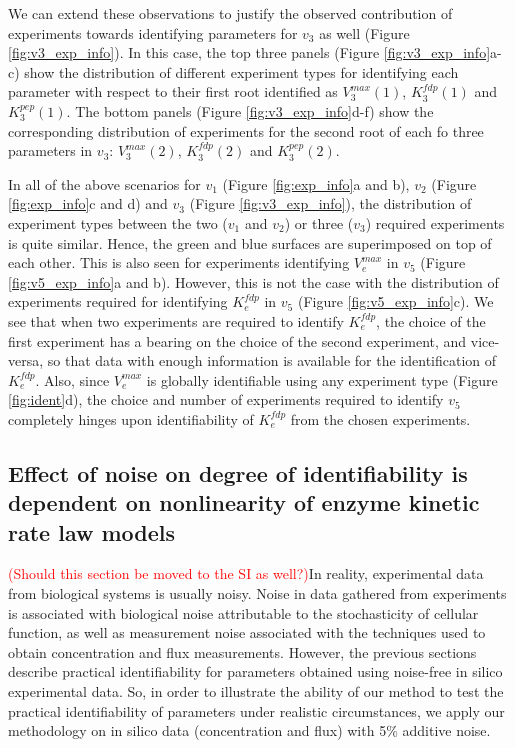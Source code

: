 \documentclass[10pt]{article}
\begin{document}
	We can extend these observations to justify the observed contribution of experiments towards identifying parameters for $v_3$ as well (Figure \ref{fig:v3_exp_info}). In this case, the top three panels (Figure \ref{fig:v3_exp_info}a-c) show the distribution of different experiment types for identifying each parameter with respect to their first root identified as $V_3^{max}(1)$, $K_3^{fdp}(1)$ and $K_3^{pep}(1)$. The bottom panels (Figure \ref{fig:v3_exp_info}d-f) show the corresponding distribution of experiments for the second root of each fo three parameters in $v_3$: $V_3^{max}(2)$, $K_3^{fdp}(2)$ and $K_3^{pep}(2)$. 
	
	In all of the above scenarios for $v_1$ (Figure \ref{fig:exp_info}a and b), $v_2$ (Figure \ref{fig:exp_info}c and d) and $v_3$ (Figure \ref{fig:v3_exp_info}), the distribution of experiment types between the two ($v_1$ and $v_2$) or three ($v_3$) required experiments is quite similar. Hence, the green and blue surfaces are superimposed on top of each other. This is also seen for experiments identifying $V_e^{max}$ in $v_5$ (Figure \ref{fig:v5_exp_info}a and b). However, this is not the case with the distribution of experiments required for identifying $K_e^{fdp}$ in $v_5$ (Figure \ref{fig:v5_exp_info}c). We see that when two experiments are required to identify $K_e^{fdp}$, the choice of the first experiment has a bearing on the choice of the second experiment, and vice-versa, so that data with enough information is available for the identification of $K_e^{fdp}$. Also, since $V_e^{max}$ is globally identifiable using any experiment type (Figure \ref{fig:ident}d), the choice and number of experiments required to identify $v_5$ completely hinges upon identifiability of $K_e^{fdp}$ from the chosen experiments.		 
		
	\subsection{Effect of noise on degree of identifiability is dependent on nonlinearity of enzyme kinetic rate law models}\label{sec:noise}
	\textcolor{red}{(Should this section be moved to the SI as well?)}In reality, experimental data from biological systems is usually noisy. Noise in data gathered from experiments is associated with biological noise attributable to the stochasticity of cellular function, as well as measurement noise associated with the techniques used to obtain concentration and flux measurements. However, the previous sections describe practical identifiability for parameters obtained using noise-free in silico experimental data. So, in order to illustrate the ability of our method to test the practical identifiability of parameters under realistic circumstances, we apply our methodology on in silico data (concentration and flux) with 5\% additive noise. 
	
\end{document}
